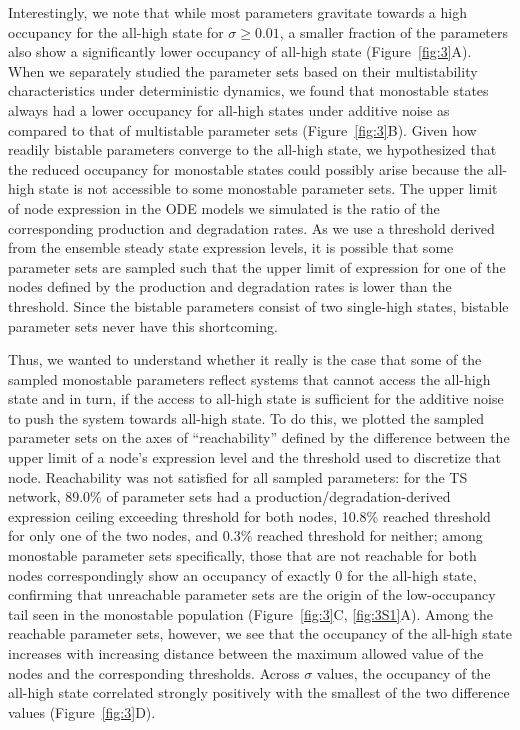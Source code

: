 \documentclass[11pt]{article}
\begin{document}
Interestingly, we note that while most parameters gravitate towards a high occupancy for the all-high state for $\sigma \geq 0.01$, a smaller fraction of the parameters also show a significantly lower occupancy of all-high state (Figure~\ref{fig:3}A). When we separately studied the parameter sets based on their multistability characteristics under deterministic dynamics, we found that monostable states always had a lower occupancy for all-high states under additive noise as compared to that of multistable parameter sets (Figure~\ref{fig:3}B). Given how readily bistable parameters converge to the all-high state, we hypothesized that the reduced occupancy for monostable states could possibly arise because the all-high state is not accessible to some monostable parameter sets.  The upper limit of node expression in the ODE models we simulated is the ratio of the corresponding production and degradation rates. As we use a threshold derived from the ensemble steady state expression levels, it is possible that some parameter sets are sampled such that the upper limit of expression for one of the nodes defined by the production and degradation rates is lower than the threshold. Since the bistable parameters consist of two single-high states, bistable parameter sets never have this shortcoming. 

Thus, we wanted to understand whether it really is the case that some of the sampled monostable parameters reflect systems that cannot access the all-high state and in turn, if the access to all-high state is sufficient for the additive noise to push the system towards all-high state. To do this, we plotted the sampled parameter sets on the axes of ``reachability'' defined by the difference between the upper limit of a node's expression level and the threshold used to discretize that node. Reachability was not satisfied for all sampled parameters: for the TS network, 89.0\% of parameter sets had a production/degradation-derived expression ceiling exceeding threshold for both nodes, 10.8\% reached threshold for only one of the two nodes, and 0.3\% reached threshold for neither; among monostable parameter sets specifically, those that are not reachable for both nodes correspondingly show an occupancy of exactly 0 for the all-high state, confirming that unreachable parameter sets are the origin of the low-occupancy tail seen in the monostable population (Figure~\ref{fig:3}C, \ref{fig:3S1}A). Among the reachable parameter sets, however, we see that the occupancy of the all-high state increases with increasing distance between the maximum allowed value of the nodes and the corresponding thresholds. Across $\sigma$ values, the occupancy of the all-high state correlated strongly positively with the smallest of the two difference values (Figure~\ref{fig:3}D).
\end{document}
